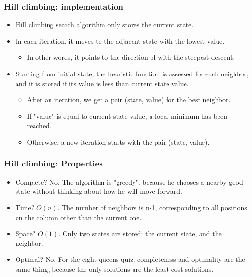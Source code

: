 \documentclass{beamer}
\begin{document}
    \begin{frame}
    \frametitle{Hill climbing: implementation}
        \begin{itemize}
            \item Hill climbing search algorithm only stores the current state.
            \pause
            \item In each iteration, it moves to the adjacent state with the lowest value.
            \pause
            \begin{itemize}
                \item In other words, it points to the direction of with the steepest descent.
            \end{itemize}
            \pause
            \item Starting from initial state, the heuristic function is assessed for each neighbor, and it is stored if its value is less than current state value.
            \pause
            \begin{itemize}
                \item After an iteration, we get a pair (state, value) for the best neighbor.
                \pause
                \item If "value" is equal to current state value, a local minimum has been reached.
                \pause
                \item Otherwise, a new iteration starts with the pair (state, value).
            \end{itemize} 
        \end{itemize}
    \end{frame}

    \begin{frame}
    \frametitle{Hill climbing: Properties}
     \begin{itemize}
         \item Complete? \pause No.
         \pause The algorithm is "greedy", because he chooses a nearby good state without thinking about how he will move forward.
         \pause
         \item Time? \pause 
         \begin{math}O(n).\end{math}
         \pause The number of neighbors is n-1, corresponding to all positions on the column other than the current one.
         \pause
         \item Space? \pause
         \begin{math}O(1).\end{math}
         \pause Only two states are stored: the current state, and the neighbor.
         \pause
         \item Optimal? \pause No. 
         \pause For the eight queens quiz, completeness and optimality are the same thing, because the only solutions are the least cost solutions.  
     \end{itemize}   
    \end{frame}
\end{document}
